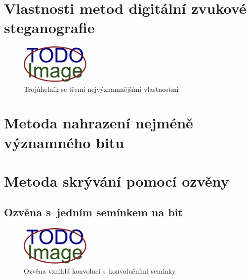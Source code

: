 \blindtext

\blindtext

\section{Vlastnosti metod digitální zvukové steganografie}
\label{sec:method-properties}


\blindtext

\blindtext

\begin{figure}[hbt]
    \centering
    \includegraphics[width=0.3\textwidth]{obrazky/placeholder.pdf}
    \caption{Trojúhelník se třemi nejvýznamnějšími vlastnostmi}
    \label{pic:method-property-triangle}
\end{figure}

\section{Metoda nahrazení nejméně významného bitu}
\label{sec:lsb}


\blindtext

\blindtext

\blindtext

\section{Metoda skrývání pomocí ozvěny}
\label{sec:echo-hiding}


\blindtext

\blindtext

\subsection*{Ozvěna s~jedním semínkem na bit}
\label{sec:echo-single-kernel}


\blindtext

\begin{figure}[hbt]
    \centering
    \includegraphics[width=0.3\textwidth]{obrazky/placeholder.pdf}
    \caption{Ozvěna vzniklá konvolucí s~konvolučními semínky}
    \label{pic:echo-single-kernel-echo}
\end{figure}

